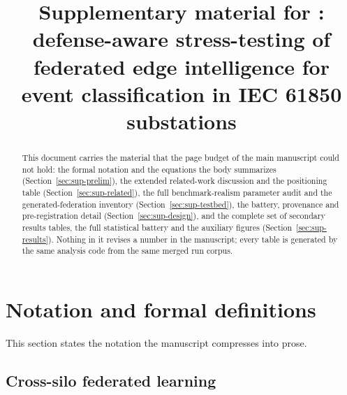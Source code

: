 \documentclass[review,12pt]{elsarticle}
\begin{document}
\begin{frontmatter}

\title{Supplementary material for \emph{\sysname}: defense-aware
stress-testing of federated edge intelligence for event classification in
IEC 61850 substations}

\begin{abstract}
This document carries the material that the page budget of the main
manuscript could not hold: the formal notation and the equations the body
summarizes (Section~\ref{sec:sup-prelim}), the extended related-work
discussion and the positioning table (Section~\ref{sec:sup-related}), the
full benchmark-realism parameter audit and the generated-federation
inventory (Section~\ref{sec:sup-testbed}), the battery, provenance and
pre-registration detail (Section~\ref{sec:sup-design}), and the complete
set of secondary results tables, the full statistical battery and the
auxiliary figures (Section~\ref{sec:sup-results}). Nothing in it revises a
number in the manuscript; every table is generated by the same analysis
code from the same merged run corpus.
\end{abstract}

\end{frontmatter}

\section{Notation and formal definitions}
\label{sec:sup-prelim}

This section states the notation the manuscript compresses into prose.

\subsection{Cross-silo federated learning}
\label{sec:sup-fl}
\end{document}
